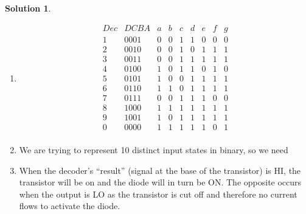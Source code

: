 \documentclass[10pt]{article}
\theoremstyle{definition}
\newtheorem{soln}{Solution}
\begin{document}
\begin{soln} ~
  \begin{enumerate}[label=(\alph*)]
    \item \begin{displaymath}
            \begin{array}{|c|c|c|c|c|c|c|c|c}
              Dec & DCBA & a & b & c & d & e & f & g \\ %
              \hline %
              1   & 0001 & 0 & 0 & 1 & 1 & 0 & 0 & 0 \\
              2   & 0010 & 0 & 0 & 1 & 0 & 1 & 1 & 1 \\
              3   & 0011 & 0 & 0 & 1 & 1 & 1 & 1 & 1 \\
              4   & 0100 & 1 & 0 & 1 & 1 & 0 & 1 & 0 \\
              5   & 0101 & 1 & 0 & 0 & 1 & 1 & 1 & 1 \\
              6   & 0110 & 1 & 1 & 0 & 1 & 1 & 1 & 1 \\
              7   & 0111 & 0 & 0 & 1 & 1 & 1 & 0 & 0 \\
              8   & 1000 & 1 & 1 & 1 & 1 & 1 & 1 & 1 \\
              9   & 1001 & 1 & 0 & 1 & 1 & 1 & 1 & 1 \\
              0   & 0000 & 1 & 1 & 1 & 1 & 1 & 0 & 1 \\
            \end{array}
          \end{displaymath}
    \item We are trying to represent 10 distinct input states in binary, so we need
    \item When the decoder's ``result'' (signal at the base of the transistor) is HI, the transistor will be on and the diode will in turn be ON. The opposite
          occurs when the output is LO as the transistor is cut off and therefore no current flows to activate the diode.
          \begin{displaymath}
            \begin{array}{|c|c|c|c|c|c|c|c|c|c}

\end{array}
\end{displaymath}
\end{enumerate}
\end{soln}
\end{document}
